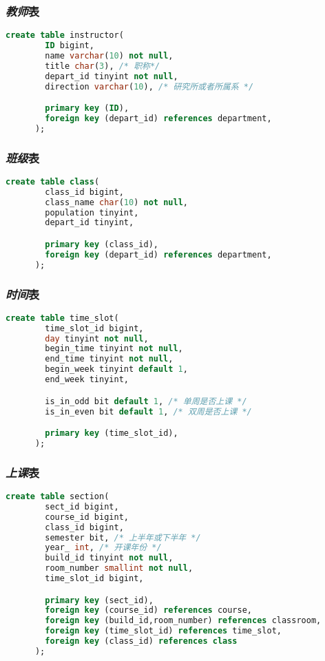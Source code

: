 \documentclass{myreport}
\begin{document}
    \subsubsection{\emph{教师}表}
    \begin{lstlisting}[language=sql]
      create table instructor(
        ID bigint,
        name varchar(10) not null,
        title char(3), /* 职称*/
        depart_id tinyint not null,
        direction varchar(10), /* 研究所或者所属系 */

        primary key (ID),
        foreign key (depart_id) references department,
      );
    \end{lstlisting}

    \subsubsection{\emph{班级}表}
    \begin{lstlisting}[language=sql]
      create table class(
        class_id bigint,
        class_name char(10) not null,
        population tinyint,
        depart_id tinyint,

        primary key (class_id),
        foreign key (depart_id) references department,
      );
    \end{lstlisting}

    \subsubsection{\emph{时间}表}
    \begin{lstlisting}[language=sql]
      create table time_slot(
        time_slot_id bigint,
        day tinyint not null,
        begin_time tinyint not null,
        end_time tinyint not null,
        begin_week tinyint default 1,
        end_week tinyint,

        is_in_odd bit default 1, /* 单周是否上课 */
        is_in_even bit default 1, /* 双周是否上课 */

        primary key (time_slot_id),
      );
    \end{lstlisting}

    \subsubsection{\emph{上课}表}
    \begin{lstlisting}[language=sql]
      create table section(
        sect_id bigint,
        course_id bigint,
        class_id bigint,
        semester bit, /* 上半年或下半年 */
        year_ int, /* 开课年份 */
        build_id tinyint not null,
        room_number smallint not null,
        time_slot_id bigint,

        primary key (sect_id),
        foreign key (course_id) references course,
        foreign key (build_id,room_number) references classroom,
        foreign key (time_slot_id) references time_slot,
        foreign key (class_id) references class
      );

    \end{lstlisting}
\end{document}
